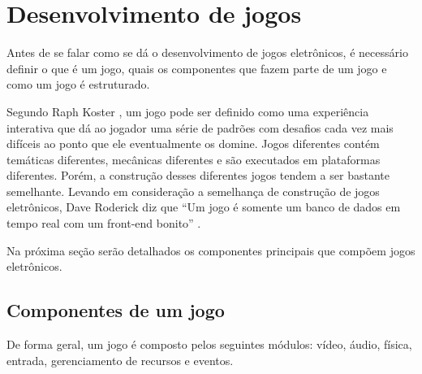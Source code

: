 \section{Desenvolvimento de jogos}

Antes de se falar como se dá o desenvolvimento de jogos eletrônicos, é necessário definir o que é um jogo, quais os componentes que fazem parte de um jogo e como um jogo é estruturado.

Segundo Raph Koster \cite{koster2014a}, um jogo pode ser definido como uma experiência interativa que dá ao jogador uma série de padrões com desafios cada vez mais difíceis ao ponto que ele eventualmente os domine. Jogos diferentes contém temáticas diferentes, mecânicas diferentes e são executados em plataformas diferentes. Porém, a construção desses diferentes jogos tendem a ser bastante semelhante. Levando em consideração a semelhança de construção de jogos eletrônicos, Dave Roderick diz que “Um jogo é somente um banco de dados em tempo real com um front-end bonito” \cite[p.~625]{rollings2004game}.

Na próxima seção serão detalhados os componentes principais que compõem jogos eletrônicos.

\subsection{Componentes de um jogo}

De forma geral, um jogo é composto pelos seguintes módulos: vídeo, áudio, física, entrada, gerenciamento de recursos e eventos.

